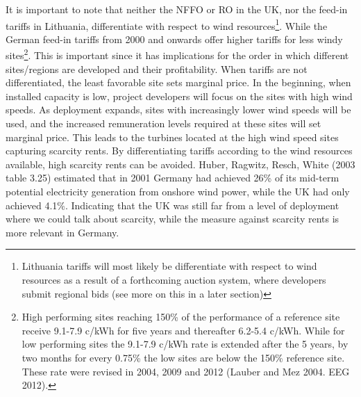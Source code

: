 \documentclass[a4paper, 12pt]{article}
\begin{document}
It is important to note that neither the NFFO or RO in the UK, nor the feed-in tariffs in Lithuania, differentiate with respect to wind resources\footnote{Lithuania tariffs will most likely be differentiate with respect to wind resources as a result of a forthcoming auction system, where developers submit regional bids (see more on this in a later section)}. While the German feed-in tariffs from 2000 and onwards offer higher tariffs for less windy sites\footnote{High performing sites reaching 150\% of the performance of a reference site receive 9.1-7.9 c/kWh for five years and thereafter 6.2-5.4 c/kWh. While for low performing sites the 9.1-7.9 c/kWh rate is extended after the 5 years, by two months for every 0.75\% the low sites are below the 150\% reference site. These rate were revised in 2004, 2009 and 2012 (Lauber and Mez 2004. EEG 2012).}. This is important since it has implications for the order in which different sites/regions are developed and their profitability. When tariffs are not differentiated, the least favorable site sets marginal price. In the beginning, when installed capacity is low, project developers will focus on the sites with high wind speeds. As deployment expands, sites with increasingly lower wind speeds will be used, and the increased remuneration levels required at these sites will set marginal price. This leads to the turbines located at the high wind speed sites capturing scarcity rents. By differentiating tariffs according to the wind resources available, high scarcity rents can be avoided. Huber, Ragwitz, Resch, White (2003 table 3.25) estimated that in 2001 Germany had achieved 26\% of its mid-term potential electricity generation from onshore wind power, while the UK had only achieved 4.1\%. Indicating that the UK was still far from a level of deployment where we could talk about scarcity, while the measure against scarcity rents is more relevant in Germany.
\end{document}
